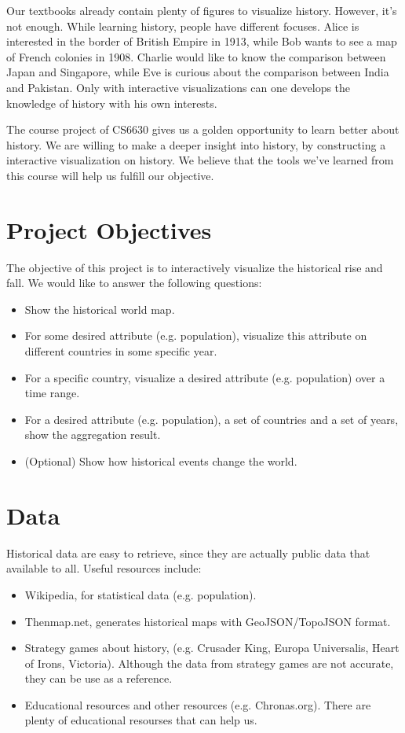 \documentclass[12pt, fullpage,letterpaper]{article}
\begin{document}
Our textbooks already contain plenty of figures to visualize history. However,
it's not enough. While learning history, people have different focuses.  Alice
is interested in the border of British Empire in 1913, while Bob wants to see a
map of French colonies in 1908. Charlie would like to know the comparison
between Japan and Singapore, while Eve is curious about the comparison between
India and Pakistan.  Only with interactive visualizations can one develops the
knowledge of history with his own interests.

The course project of CS6630 gives us a golden opportunity to learn better
about history.  We are willing to make a deeper insight into history, by
constructing a interactive visualization on history. We believe that the tools
we've learned from this course will help us fulfill our objective.


\section{Project Objectives}
The objective of this project is to interactively visualize the historical rise
and fall.  We would like to answer the following questions:
\begin{itemize}
    \item Show the historical world map.
    \item For some desired attribute (e.g. population), visualize this attribute on different countries in some specific year.
    \item For a specific country, visualize a desired attribute (e.g. population) over a time range.
    \item For a desired attribute (e.g. population), a set of countries and a set of years, show the aggregation result.
    \item (Optional) Show how historical events change the world.
\end{itemize}

\section{Data}
Historical data are easy to retrieve, since they are actually public data that available to all.
Useful resources include:

\begin{itemize}
    \item Wikipedia, for statistical data (e.g. population).
    \item Thenmap.net, generates historical maps with GeoJSON/TopoJSON format.
    \item Strategy games about history, (e.g. Crusader King, Europa Universalis, Heart of Irons, Victoria). Although the data from strategy games are not accurate, they can be use
        as a reference.
    \item Educational resources and other resources (e.g. Chronas.org). There are plenty of educational resourses that can help us.
\end{itemize}
\end{document}
